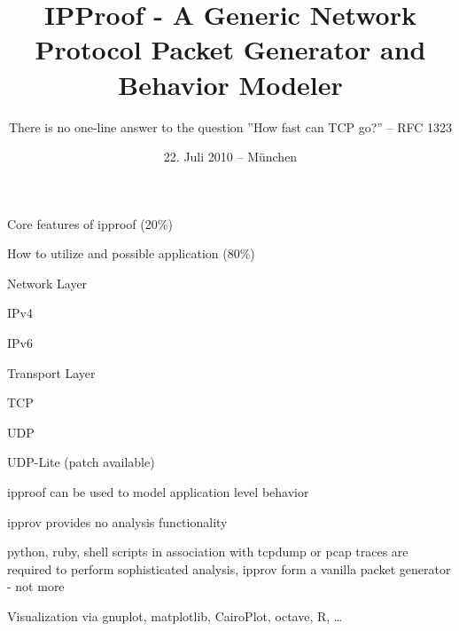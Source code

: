 \documentclass[9pt]{article}
\begin{document}
\title{IPProof - A Generic Network Protocol Packet Generator and Behavior Modeler}

\subtitle{\textsf{There is no one-line answer to the question ''How fast can TCP go?'' -- RFC 1323}}


\email{}
\date{\textsf{22. Juli 2010 -- München}}
\maketitle


\begin{slide}
\bi
	\item Core features of ipproof (20\%)
	\item How to utilize and possible application (80\%)
\ei
\end{slide}


\begin{slide}
\bi
	\item Network Layer
	\bi
		\item IPv4
		\item IPv6
	\ei
	\item Transport Layer
	\bi
		\item TCP
		\item UDP
		\item UDP-Lite (patch available)
	\ei
	\item ipproof can be used to model application level behavior
\ei
\end{slide}


\begin{slide}
\bi
	\item ipprov provides no analysis functionality
	\item python, ruby, shell scripts in association with tcpdump or pcap traces are required to perform sophisticated analysis,
	ipprov form a vanilla packet generator - not more
	\item Visualization via gnuplot, matplotlib, CairoPlot, octave, R, \dots
\ei
\end{slide}
\end{document}
